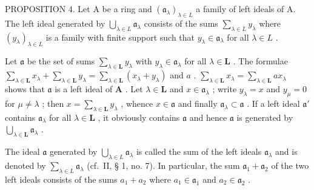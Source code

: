 PROPOSITION 4. Let A be a ring and \((\mathfrak{a}_{\lambda})_{\lambda \in L}\) a family of left ideals of A. The left ideal generated by \(\bigcup_{\lambda \in L} \mathfrak{a}_{\lambda}\) consists of the sums \(\sum_{\lambda \in L} y_{\lambda}\) where \((y_{\lambda})_{\lambda \in L}\) is a family with finite support such that \(y_{\lambda} \in \mathfrak{a}_{\lambda}\) for all \(\lambda \in L\) .

Let \(\mathfrak{a}\) be the set of sums \(\sum_{\lambda \in \mathbf{L}} y_{\lambda}\) with \(y_{\lambda} \in \mathfrak{a}_{\lambda}\) for all \(\lambda \in \mathbf{L}\) . The formulae \(\sum_{\lambda \in \mathbf{L}} x_{\lambda} + \sum_{\lambda \in \mathbf{L}} y_{\lambda} = \sum_{\lambda \in \mathbf{L}} (x_{\lambda} + y_{\lambda})\) and \(a\) . \(\sum_{\lambda \in \mathbf{L}} x_{\lambda} = \sum_{\lambda \in \mathbf{L}} ax_{\lambda}\) shows that \(\mathfrak{a}\) is a left ideal of \(\mathbf{A}\) . Let \(\lambda \in \mathbf{L}\) and \(x \in \mathfrak{a}_{\lambda}\) ; write \(y_{\lambda} = x\) and \(y_{\mu} = 0\) for \(\mu \neq \lambda\) ; then \(x = \sum_{\lambda \in \mathbf{L}} y_{\lambda}\) , whence \(x \in \mathfrak{a}\) and finally \(\mathfrak{a}_{\lambda} \subset \mathfrak{a}\) . If a left ideal \(\mathfrak{a}'\) contains \(\mathfrak{a}_{\lambda}\) for all \(\lambda \in \mathbf{L}\) , it obviously contains \(\mathfrak{a}\) and hence \(\mathfrak{a}\) is generated by \(\bigcup_{\lambda \in \mathbf{L}} \mathfrak{a}_{\lambda}\) .

The ideal \(\mathfrak{a}\) generated by \(\bigcup_{\lambda \in L} \mathfrak{a}_{\lambda}\) is called the sum of the left ideals \(\mathfrak{a}_{\lambda}\) and is denoted by \(\sum_{\lambda \in L} \mathfrak{a}_{\lambda}\) (cf.~II, § 1, no. 7). In particular, the sum \(\mathfrak{a}_{1} + \mathfrak{a}_{2}\) of the two left ideals consists of the sums \(a_{1} + a_{2}\) where \(a_{1} \in \mathfrak{a}_{1}\) and \(a_{2} \in \mathfrak{a}_{2}\) .

